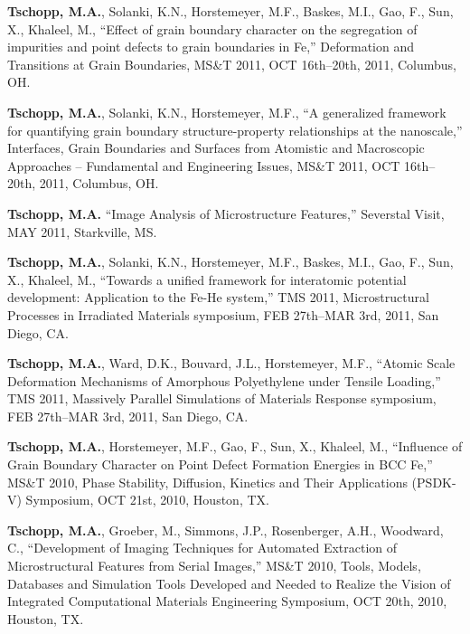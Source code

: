 \begin{cvlist}
\item
\textbf{Tschopp, M.A.}, Solanki, K.N., Horstemeyer, M.F., Baskes, M.I., Gao, F., Sun, X., Khaleel, M., ``Effect of grain boundary character on the segregation of impurities and point defects to grain boundaries in Fe,'' Deformation and Transitions at Grain Boundaries, MS\&T 2011, OCT 16th--20th, 2011, Columbus, OH.

\item
\textbf{Tschopp, M.A.}, Solanki, K.N., Horstemeyer, M.F., ``A generalized framework for quantifying grain boundary structure-property relationships at the nanoscale,'' Interfaces, Grain Boundaries and Surfaces from Atomistic and Macroscopic Approaches -- Fundamental and Engineering Issues, MS\&T 2011, OCT 16th--20th, 2011, Columbus, OH.

\item
\textbf{Tschopp, M.A.} ``Image Analysis of Microstructure Features,'' Severstal Visit, MAY 2011, Starkville, MS.

\item
\textbf{Tschopp, M.A.}, Solanki, K.N., Horstemeyer, M.F., Baskes, M.I., Gao, F., Sun, X., Khaleel, M., ``Towards a unified framework for interatomic potential development: Application to the Fe-He system,''  TMS 2011, Microstructural Processes in Irradiated Materials symposium, FEB 27th--MAR 3rd, 2011, San Diego, CA.

\item
\textbf{Tschopp, M.A.}, Ward, D.K., Bouvard, J.L., Horstemeyer, M.F., ``Atomic Scale Deformation Mechanisms of Amorphous Polyethylene under Tensile Loading,'' TMS 2011, Massively Parallel Simulations of Materials Response symposium, FEB 27th--MAR 3rd, 2011, San Diego, CA.

\item
\textbf{Tschopp, M.A.}, Horstemeyer, M.F., Gao, F., Sun, X., Khaleel, M., ``Influence of Grain Boundary Character on Point Defect Formation Energies in BCC Fe,'' MS\&T 2010, Phase Stability, Diffusion, Kinetics and Their Applications (PSDK-V) Symposium,  OCT 21st, 2010, Houston, TX.

\item
\textbf{Tschopp, M.A.}, Groeber, M., Simmons, J.P., Rosenberger, A.H., Woodward, C., ``Development of Imaging Techniques for Automated Extraction of Microstructural Features from Serial Images,'' MS\&T 2010, Tools, Models, Databases and Simulation Tools Developed and Needed to Realize the Vision of Integrated Computational Materials Engineering Symposium, OCT 20th, 2010, Houston, TX.


\end{cvlist}
